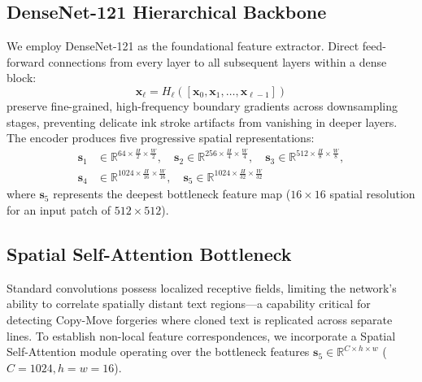 \documentclass[runningheads]{llncs}
\begin{document}
\subsection{DenseNet-121 Hierarchical Backbone}\label{subsec4_2}
We employ DenseNet-121 \cite{bib14} as the foundational feature extractor. Direct feed-forward connections from every layer to all subsequent layers within a dense block:
\begin{equation}
\mathbf{x}_\ell = H_\ell([\mathbf{x}_0, \mathbf{x}_1, \dots, \mathbf{x}_{\ell-1}])\label{eq_dense}
\end{equation}
preserve fine-grained, high-frequency boundary gradients across downsampling stages, preventing delicate ink stroke artifacts from vanishing in deeper layers. The encoder produces five progressive spatial representations:
\begin{align}
\mathbf{s}_1 &\in \mathbb{R}^{64 \times \frac{H}{2} \times \frac{W}{2}}, \quad \mathbf{s}_2 \in \mathbb{R}^{256 \times \frac{H}{4} \times \frac{W}{4}}, \quad \mathbf{s}_3 \in \mathbb{R}^{512 \times \frac{H}{8} \times \frac{W}{8}}, \nonumber \\
\mathbf{s}_4 &\in \mathbb{R}^{1024 \times \frac{H}{16} \times \frac{W}{16}}, \quad \mathbf{s}_5 \in \mathbb{R}^{1024 \times \frac{H}{32} \times \frac{W}{32}}\label{eq_features}
\end{align}
where $\mathbf{s}_5$ represents the deepest bottleneck feature map ($16 \times 16$ spatial resolution for an input patch of $512 \times 512$).

\subsection{Spatial Self-Attention Bottleneck}\label{subsec4_3}
Standard convolutions possess localized receptive fields, limiting the network's ability to correlate spatially distant text regions---a capability critical for detecting Copy-Move forgeries where cloned text is replicated across separate lines. To establish non-local feature correspondences, we incorporate a Spatial Self-Attention module \cite{bib15} operating over the bottleneck features $\mathbf{s}_5 \in \mathbb{R}^{C \times h \times w}$ ($C = 1024, h = w = 16$).
\end{document}
